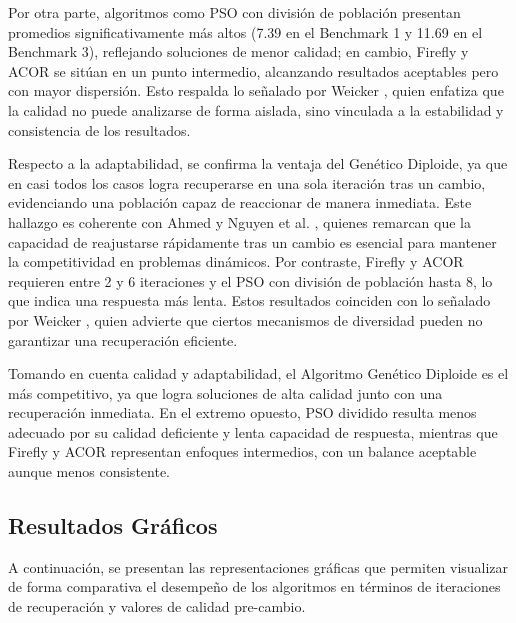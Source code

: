 \documentclass[10pt]{article}
\begin{document}
Por otra parte, algoritmos como PSO con división de población presentan promedios significativamente más altos (7.39 en el Benchmark 1 y 11.69 en el Benchmark 3), reflejando soluciones de menor calidad; en cambio, Firefly y ACOR se sitúan en un punto intermedio, alcanzando resultados aceptables pero con mayor dispersión. Esto respalda lo señalado por Weicker \cite{weicker2003performance}, quien enfatiza que la calidad no puede analizarse de forma aislada, sino vinculada a la estabilidad y consistencia de los resultados.

Respecto a la adaptabilidad, se confirma la ventaja del Genético Diploide, ya que en casi todos los casos logra recuperarse en una sola iteración tras un cambio, evidenciando una población capaz de reaccionar de manera inmediata. Este hallazgo es coherente con Ahmed \cite{ahmed2024adaptive} y Nguyen et al. \cite{nguyen2013kd}, quienes remarcan que la capacidad de reajustarse rápidamente tras un cambio es esencial para mantener la competitividad en problemas dinámicos. Por contraste, Firefly y ACOR requieren entre 2 y 6 iteraciones y el PSO con división de población hasta 8, lo que indica una respuesta más lenta. Estos resultados coinciden con lo señalado por Weicker \cite{weicker2003performance}, quien advierte que ciertos mecanismos de diversidad pueden no garantizar una recuperación eficiente.

Tomando en cuenta calidad y adaptabilidad, el Algoritmo Genético Diploide es el más competitivo, ya que logra soluciones de alta calidad junto con una recuperación inmediata. En el extremo opuesto, PSO dividido resulta menos adecuado por su calidad deficiente y lenta capacidad de respuesta, mientras que Firefly y ACOR representan enfoques intermedios, con un balance aceptable aunque menos consistente.



\subsection*{Resultados Gráficos}

A continuación, se presentan las representaciones gráficas que permiten visualizar de forma comparativa el desempeño de los algoritmos en términos de iteraciones de recuperación y valores de calidad pre-cambio.
\end{document}
